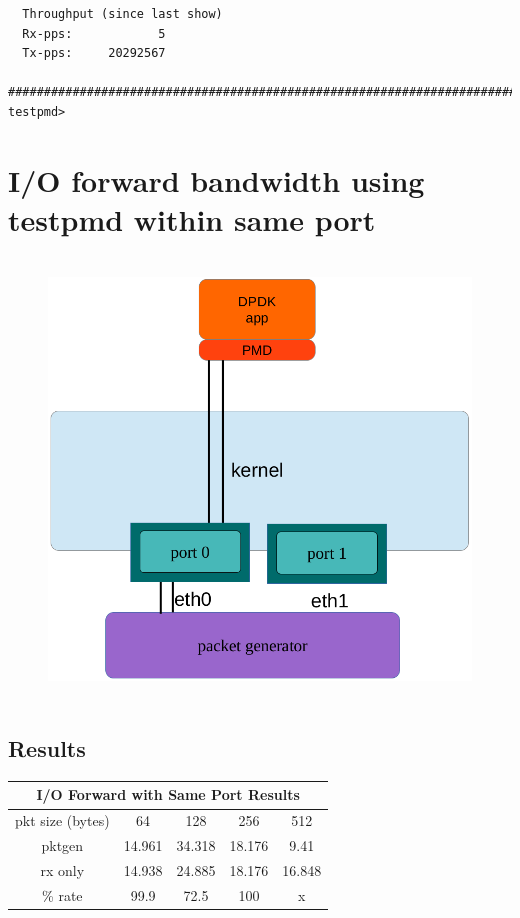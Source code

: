 \documentclass[letter]{article}
\begin{document}
{{\begin{lstlisting}
  Throughput (since last show)
  Rx-pps:            5
  Tx-pps:     20292567
  ############################################################################
testpmd> 

\end{lstlisting}




\section{I/O forward bandwidth using testpmd within same port}
{\setlength{\parindent}{0cm}

\begin{figure}[H]
\hbox{\hspace{-0.5cm} \includegraphics[scale=0.6]{i-o-1-port} }
\end{figure}

\subsection{Results}
\large
\begin{center}
\begin{tabular}{ |c|c|c|c|c| }
\hline
\multicolumn{5}{|c|}{I/O Forward with Same Port Results} \\
 \hline
 pkt size (bytes) & 64 & 128 & 256 & 512 \\ 
\hline
 pktgen & 14.961 & 34.318 & 18.176 & 9.41  \\ 
 rx only & 14.938 & 24.885 & 18.176 & 16.848 \\ 
\hline
\rowcolor{yellow}
\% rate & 99.9 & 72.5 & 100 & x \\
 \hline
\end{tabular}
\end{center}

}}}
\end{document}
